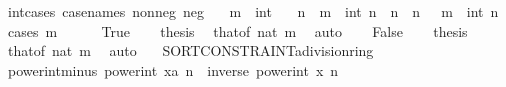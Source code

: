 \begin{isabellebody}
\isanewline
{}\isamarkupfalse%
\ int{\isacharunderscore}{\kern0pt}cases{}\ {\isacharbrackleft}{\kern0pt}case{\isacharunderscore}{\kern0pt}names\ nonneg\ neg{\isacharbrackright}{\kern0pt}{\isacharcolon}{\kern0pt}\isanewline
\ \ \ m\ {\isacharcolon}{\kern0pt}{\isacharcolon}{\kern0pt}\ int\isanewline
\ \ \ n\ \ {\isachardoublequoteopen}m\ {\isacharequal}{\kern0pt}\ int\ n{\isachardoublequoteclose}\ {\isacharbar}{\kern0pt}\ n\ \ {\isachardoublequoteopen}n\ {\isachargreater}{\kern0pt}\ {}{\isachardoublequoteclose}\ {\isachardoublequoteopen}m\ {\isacharequal}{\kern0pt}\ {\isacharminus}{\kern0pt}int\ n{\isachardoublequoteclose}\isanewline
%
\isadelimproof
%
\endisadelimproof
%
\isatagproof
{}\isamarkupfalse%
\ {\isacharparenleft}{\kern0pt}cases\ {\isachardoublequoteopen}m\ {\isasymge}\ {}{\isachardoublequoteclose}{\isacharparenright}{\kern0pt}\isanewline
\ \ \isamarkupfalse%
\ True\isanewline
\ \ \isamarkupfalse%
\ {\isacharquery}{\kern0pt}thesis\ \isamarkupfalse%
\ that{\isacharparenleft}{\kern0pt}{}{\isacharparenright}{\kern0pt}{\isacharbrackleft}{\kern0pt}of\ {\isachardoublequoteopen}nat\ m{\isachardoublequoteclose}{\isacharbrackright}{\kern0pt}\ \isamarkupfalse%
\ auto\isanewline
{}\isamarkupfalse%
\isanewline
\ \ \isamarkupfalse%
\ False\isanewline
\ \ \isamarkupfalse%
\ {\isacharquery}{\kern0pt}thesis\ \isamarkupfalse%
\ that{\isacharparenleft}{\kern0pt}{}{\isacharparenright}{\kern0pt}{\isacharbrackleft}{\kern0pt}of\ {\isachardoublequoteopen}nat\ {\isacharparenleft}{\kern0pt}{\isacharminus}{\kern0pt}m{\isacharparenright}{\kern0pt}{\isachardoublequoteclose}{\isacharbrackright}{\kern0pt}\ \isamarkupfalse%
\ auto\isanewline
{}\isamarkupfalse%
%
\endisatagproof
{\isafoldproof}%
%
\isadelimproof
\isanewline
%
\endisadelimproof
\isanewline
\isanewline
{}\isamarkupfalse%
\isanewline
\ \ \ {\isachardoublequoteopen}SORT{\isacharunderscore}{\kern0pt}CONSTRAINT{\isacharparenleft}{\kern0pt}{\isacharprime}{\kern0pt}a{\isacharcolon}{\kern0pt}{\isacharcolon}{\kern0pt}division{\isacharunderscore}{\kern0pt}ring{\isacharparenright}{\kern0pt}{\isachardoublequoteclose}\isanewline
{}\isanewline
\isanewline
{}\isamarkupfalse%
\ power{\isacharunderscore}{\kern0pt}int{\isacharunderscore}{\kern0pt}minus{\isacharcolon}{\kern0pt}\ {\isachardoublequoteopen}power{\isacharunderscore}{\kern0pt}int\ {\isacharparenleft}{\kern0pt}x{\isacharcolon}{\kern0pt}{\isacharcolon}{\kern0pt}{\isacharprime}{\kern0pt}a{\isacharparenright}{\kern0pt}\ {\isacharparenleft}{\kern0pt}{\isacharminus}{\kern0pt}n{\isacharparenright}{\kern0pt}\ {\isacharequal}{\kern0pt}\ inverse\ {\isacharparenleft}{\kern0pt}power{\isacharunderscore}{\kern0pt}int\ x\ n{\isacharparenright}{\kern0pt}{\isachardoublequoteclose}\isanewline

\end{isabellebody}
